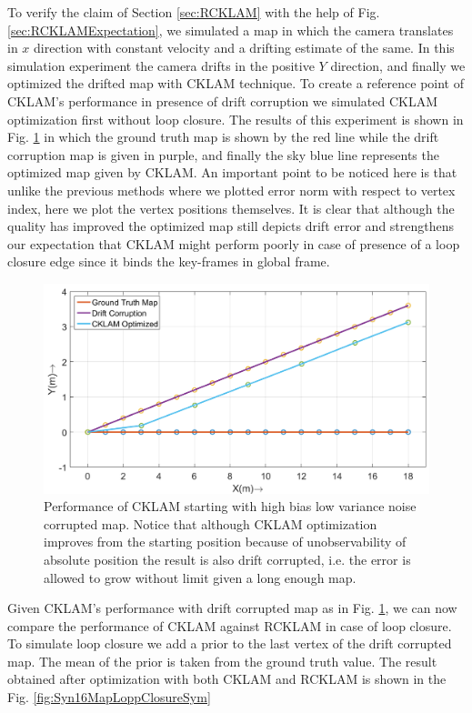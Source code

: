   To verify the claim of Section \ref{sec:RCKLAM} with the help of Fig. \ref{sec:RCKLAMExpectation}, we simulated a map in which the camera translates in $x$ direction with constant velocity and a drifting estimate of the same. In this simulation experiment the camera drifts in the positive $Y$ direction, and finally we optimized the drifted map with CKLAM technique. To create a reference point of CKLAM's performance in presence of drift corruption we simulated CKLAM optimization first without loop closure. The results of this experiment is shown in Fig. \ref{fig:Syn16MapCklam} in which the ground truth map is shown by the red line while the drift corruption map is given in purple, and finally the sky blue line represents the optimized map given by CKLAM. An important point to be noticed here is that unlike the previous methods where we plotted error norm with respect to vertex index, here we plot the vertex positions themselves. It is clear that although the quality has improved the optimized map still depicts drift error and strengthens our expectation that CKLAM might perform poorly in case of presence of a loop closure edge since it binds the key-frames in global frame.
  
\begin{figure}
  \centering
    \includegraphics[width=1.00\textwidth]{images/Syn16_map_cklam.png}
  \caption{Performance of CKLAM starting with high bias low variance noise corrupted map. Notice that although CKLAM optimization improves from the starting position because of unobservability of absolute position the result is also drift corrupted, i.e. the error is allowed to grow without limit given a long enough map.}
  \label{fig:Syn16MapCklam}
\end{figure}
  
  Given CKLAM's performance with drift corrupted map as in Fig. \ref{fig:Syn16MapCklam}, we can now compare the performance of CKLAM against RCKLAM in case of loop closure. To simulate loop closure we add a prior to the last vertex of the drift corrupted map. The mean of the prior is taken from the ground truth value. The result obtained after optimization with both CKLAM and RCKLAM is shown in the Fig. \ref{fig:Syn16MapLoppClosureSym}
  
